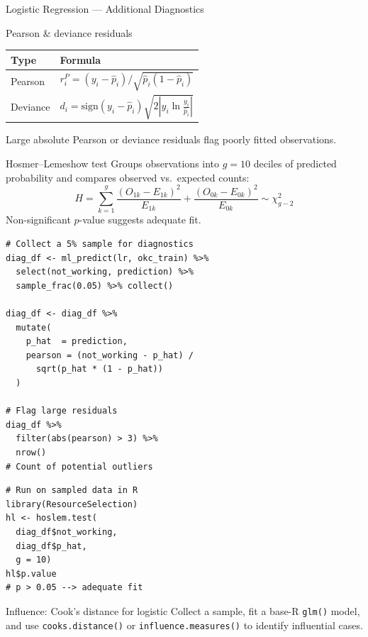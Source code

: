 \documentclass[11pt, aspectratio=169]{beamer}
\begin{document}
\begin{frame}{Logistic Regression --- Additional Diagnostics}
	\begin{block}{Pearson \& deviance residuals}
				\begin{tabular}{ll}
					\toprule
					\textbf{Type} & \textbf{Formula}\\
					\midrule
					Pearson & $r_i^P = (y_i - \hat p_i)/\sqrt{\hat p_i(1-\hat p_i)}$\\
					Deviance & $d_i = \mathrm{sign}(y_i-\hat p_i)\sqrt{2|y_i\ln\frac{y_i}{\hat p_i}|}$\\
					\bottomrule
				\end{tabular}
				\medskip

				Large absolute Pearson or deviance residuals flag
				poorly fitted observations.
			\end{block}
			\begin{block}{Hosmer--Lemeshow test}
				Groups observations into $g = 10$ deciles of predicted
				probability and compares observed vs.\ expected counts:
				\[
				H = \sum_{k=1}^{g}
				\frac{(O_{1k}-E_{1k})^2}{E_{1k}} +
				\frac{(O_{0k}-E_{0k})^2}{E_{0k}}
				\sim \chi^2_{g-2}
				\]
				Non-significant $p$-value suggests adequate fit.
			\end{block}
		\begin{lstlisting}[title={Pearson residuals via sampled data}]
# Collect a 5% sample for diagnostics
diag_df <- ml_predict(lr, okc_train) %>%
  select(not_working, prediction) %>%
  sample_frac(0.05) %>% collect()

diag_df <- diag_df %>%
  mutate(
    p_hat  = prediction,
    pearson = (not_working - p_hat) /
      sqrt(p_hat * (1 - p_hat))
  )

# Flag large residuals
diag_df %>%
  filter(abs(pearson) > 3) %>%
  nrow()
# Count of potential outliers
			\end{lstlisting}
			\begin{lstlisting}[title={Hosmer--Lemeshow test (via ResourceSelection)}]
# Run on sampled data in R
library(ResourceSelection)
hl <- hoslem.test(
  diag_df$not_working,
  diag_df$p_hat,
  g = 10)
hl$p.value
# p > 0.05 --> adequate fit
			\end{lstlisting}
			\begin{exampleblock}{Influence: Cook's distance for logistic}
				Collect a sample, fit a base-R \texttt{glm()} model, and
				use \texttt{cooks.distance()} or \texttt{influence.measures()}
				to identify influential cases.
			\end{exampleblock}
		\end{frame}
\end{document}
